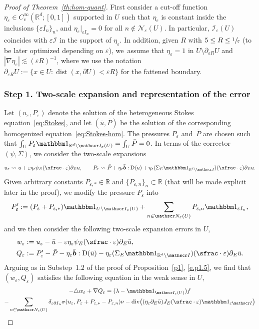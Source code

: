 \documentclass[10pt]{amsart}
\let\mathcal\mathscr
\let\mathds\mathbbm
\theoremstyle{plain}
\theoremstyle{definition}
\newcommand{\e}{\varepsilon}
\newcommand{\dist}{\operatorname{dist}}
\newcommand{\R}{\mathbb R}
\newcommand{\Ic}{\mathcal I}
\newcommand{\Nc}{\mathcal N}
\newcommand{\D}{\operatorname{D}}
\newcommand{\bb}{\bar{\boldsymbol b}}
\newcommand{\Div}{{\operatorname{div}}}
\newcommand{\step}[1]{\subsubsection*{Step #1}}
\begin{document}
\begin{proof}[Proof of Theorem~\ref{th:hom-quant}]
First consider a cut-off function $\eta_\e\in C^\infty_c(\R^d;[0,1])$ supported in $U$ such that $\eta_\e$ is constant inside the inclusions $\{\e I_n\}_n$, and $\eta_\e|_{\e I_n}=0$ for all $n\notin\Nc_\e(U)$. In particular, $\Ic_\e(U)$ coincides with $\e\Ic$ in the support of $\eta_\e$. In addition, given $R$ with $5\le R\le\sfrac1\e$ (to be later optimized depending on $\e$), we~assume that $\eta_\e=1$ in $U\setminus\partial_{\e R}U$ and $|\nabla\eta_\e|\lesssim(\e R)^{-1}$, where we use the notation \mbox{$\partial_{\e R}U:=\{x\in U:\dist(x,\partial U)<\e R\}$} for the fattened boundary.

\step{1. Two-scale expansion and representation of the error}
Let $(u_\e,P_\e)$ denote the solution of the heterogeneous Stokes equation~\eqref{eq:Stokes}, and let $(\bar u,\bar P)$ be the solution of the corresponding homogenized equation~\eqref{eq:Stokes-hom}.
The pressures $P_\e$ and~$\bar P$ are chosen such that $\int_{U}P_\e\mathds1_{\R^d\setminus\Ic_\e(U)}=\int_{U}\bar P=0$.
In terms of the corrector $(\psi,\Sigma)$, we consider the two-scale expansions
\[u_\e\leadsto\bar u+\e\eta_\e\psi_E(\sfrac\cdot\e)\partial_E\bar u,
\qquad P_\e\leadsto\bar P+\eta_\e\bb:\D(\bar u)+\eta_\e(\Sigma_E\mathds1_{\R^d\setminus\Ic})(\sfrac\cdot\e)\partial_E\bar u.\]
Given arbitrary constants $P_{\e,*}\in\R$ and $\{P_{\e,n}\}_n\subset\R$ (that will be made explicit later in the proof), we modify the pressure $P_\e$ into
\[P_\e':=(P_\e+P_{\e,*})\mathds1_{U\setminus\Ic_\e(U)}+\sum_{n\in\Nc_\e(U)}P_{\e,n}\mathds1_{\e I_n},\]
and we then consider the following two-scale expansion errors in $U$,
\begin{align*}
w_\e&:= u_\e-\bar u-\e\eta_\e\psi_E(\sfrac\cdot\e)\partial_E\bar u,\\
Q_\e&:= P_\e'-\bar P-\eta_\e\bb:\D(\bar u)-\eta_\e(\Sigma_E\mathds1_{\R^d\setminus\Ic})(\sfrac\cdot\e)\partial_E\bar u.
\end{align*}
Arguing as in Substep~1.2 of the proof of Proposition~\ref{p1}, \cf \eqref{e.p1.5},
we find that $(w_\e,Q_\e)$ satisfies the following equation in the weak sense in $U$,
\begin{multline}\label{eq:error-wPeps}
-\triangle w_\e+\nabla Q_\e=(\lambda-\mathds1_{\Ic_\e(U)})f\\
-\sum_{n\in\Nc_\e(U)}\delta_{\e\partial I_n}\sigma(u_\e,P_\e+P_{\e,*}-P_{\e,n})\nu
-\Div\big((\eta_\e\partial_E\bar u)J_E(\sfrac\cdot\e)\mathds1_{\e\Ic}\big)\\

\end{multline}
\end{proof}
\end{document}
